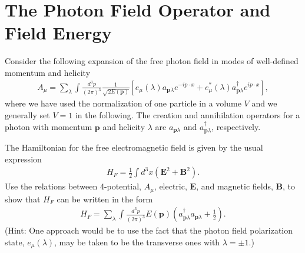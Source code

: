 \documentclass[working, oneside]{../../../Preambles/tuftebook}
\begin{document}
\chapter{The Photon Field Operator and Field Energy}
\noindent Consider the following expansion of the free photon field in 
modes of well-defined momentum and helicity
\begin{align}\label{afield}
A_{\mu}=\sum_\lambda\int\frac{d^3p}{(2\pi)^3}\frac{1}{\sqrt{2E(\bm p)}}
\left[e_{\mu}(\lambda)a_{\bm p\lambda}e^{-ip\cdot x}+e_{\mu}^{*}(\lambda)a_{\bm p\lambda}^{\dagger}e^{ip\cdot x} \right],
\end{align}
where we have used the normalization of one particle in a volume $V$ and 
we generally set $V=1$ in the following. The creation and annihilation operators
for a photon with momentum $\bm p$ and helicity $\lambda$ are $a_{\bm p\lambda}$
and $a_{\bm p\lambda}^{\dagger}$, respectively.
\begin{exercise}[1]
The Hamiltonian for the free electromagnetic field is given 
by the usual expression 
\begin{align}
H_F=\frac{1}{2}\int d^3x \left(\bm E^2+\bm B^2\right).
\end{align}
Use the relations between 4-potential, $A_\mu$, electric, $\bm E$, and 
magnetic fields, $\bm B$, to show that $H_F$ can be written in the form
\begin{align}
H_F=\sum_{\lambda}\int\frac{d^3p}{(2\pi)^3}E(\bm p)\left(a_{\bm p\lambda}^{\dagger}a_{\bm p\lambda}+\frac{1}{2}\right).
\end{align}
(Hint: One approach would be to use the fact that the photon field polarization state, $e_{\mu}(\lambda)$, may be taken to be 
the transverse ones with $\lambda=\pm 1$.)
\end{exercise}
\end{document}
